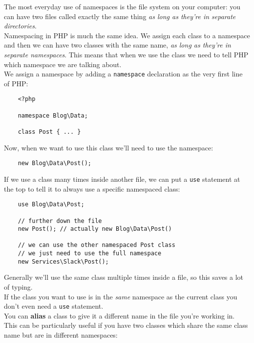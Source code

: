 The most everyday use of namespaces is the file system on your computer: you can have two files called exactly the same thing \textit{as long as they're in separate directories}.
\\

Namespacing in PHP is much the same idea. We assign each class to a namespace and then we can have two classes with the same name, \textit{as long as they're in separate namespaces}. This means that when we use the class we need to tell PHP which namespace we are talking about.
\\

We assign a namespace by adding a \texttt{namespace} declaration as the very first line of PHP:

\begin{verbatim}
    <?php

    namespace Blog\Data;

    class Post { ... }
\end{verbatim}

Now, when we want to use this class we'll need to use the namespace:

\begin{verbatim}
    new Blog\Data\Post();
\end{verbatim}

\pagebreak

If we use a class many times inside another file, we can put a \texttt{use} statement at the top to tell it to always use a specific namespaced class:

\begin{verbatim}
    use Blog\Data\Post;

    // further down the file
    new Post(); // actually new Blog\Data\Post()

    // we can use the other namespaced Post class
    // we just need to use the full namespace
    new Services\Slack\Post();
\end{verbatim}

Generally we'll use the same class multiple times inside a file, so this saves a lot of typing.
\\

If the class you want to use is in the \textit{same} namespace as the current class you don't even need a \texttt{use} statement.
\\

You can \textbf{alias} a class to give it a different name in the file you're working in. This can be particularly useful if you have two classes which share the same class name but are in different namespaces:

